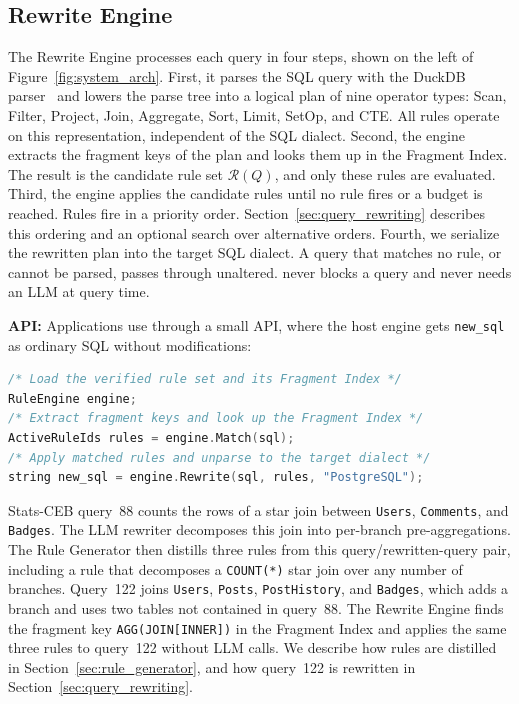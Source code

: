 \subsection{Rewrite Engine}
\label{sec:arch_engine}
The Rewrite Engine processes each query in four steps, shown on the left of Figure~\ref{fig:system_arch}.
First, it parses the SQL query with the DuckDB parser~\cite{DuckDB} and lowers the parse tree into a logical plan of nine operator types: \textsf{Scan}, \textsf{Filter}, \textsf{Project}, \textsf{Join}, \textsf{Aggregate}, \textsf{Sort}, \textsf{Limit}, \textsf{SetOp}, and \textsf{CTE}.
All rules operate on this representation, independent of the SQL dialect.
Second, the engine extracts the fragment keys of the plan and looks them up in the Fragment Index. The result is the candidate rule set $\mathcal{R}(Q)$, and only these rules are evaluated.
Third, the engine applies the candidate rules until no rule fires or a budget is reached. Rules fire in a priority order. Section~\ref{sec:query_rewriting} describes this ordering and an optional search over alternative orders.
Fourth, we serialize the rewritten plan into the target SQL dialect.
A query that matches no rule, or cannot be parsed, passes through unaltered.
{\sys} never blocks a query and never needs an LLM at query time.\shorten

\textbf{API:} Applications use {\sys} through a small API, where the host engine gets \texttt{new\_sql} as ordinary SQL without modifications:
\begin{lstlisting}[style=ide, language=C++, morekeywords={RuleEngine, ActiveRuleIds, string}]
/* Load the verified rule set and its Fragment Index */
RuleEngine engine;
/* Extract fragment keys and look up the Fragment Index */
ActiveRuleIds rules = engine.Match(sql);
/* Apply matched rules and unparse to the target dialect */
string new_sql = engine.Rewrite(sql, rules, "PostgreSQL");
\end{lstlisting}

\begin{example}
Stats-CEB query~88 counts the rows of a star join between \texttt{Users}, \texttt{Comments}, and \texttt{Badges}.
The LLM rewriter decomposes this join into per-branch pre-aggregations.
The Rule Generator then distills three rules from this query/rewritten-query pair, including a rule that decomposes a \texttt{COUNT(*)} star join over any number of branches.
Query~122 joins \texttt{Users}, \texttt{Posts}, \texttt{PostHistory}, and \texttt{Badges}, which adds a branch and uses two tables not contained in query~88.
The Rewrite Engine finds the fragment key \texttt{AGG(JOIN[INNER])} in the Fragment Index and applies the same three rules to query~122 without LLM calls.
We describe how rules are distilled in Section~\ref{sec:rule_generator}, and how query~122 is rewritten in Section~\ref{sec:query_rewriting}.
\end{example}